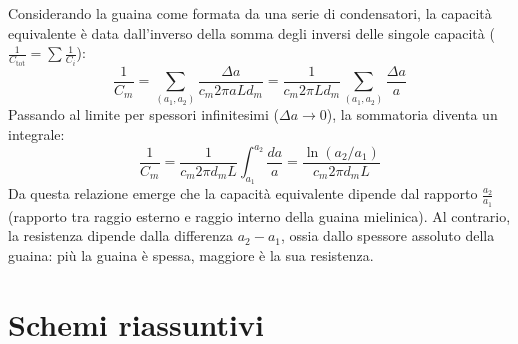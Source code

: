 Considerando la guaina come formata da una serie di condensatori, la capacità equivalente è data dall'inverso della somma degli inversi delle singole capacità ($\frac{1}{C_{\text{tot}}} = \sum \frac{1}{C_i}$):
\begin{equation}
    \frac{1}{C_m} = \sum_{(a_1, a_2)} \frac{\Delta a}{c_m 2\pi a L d_m} = \frac{1}{c_m 2\pi L d_m} \sum_{(a_1, a_2)} \frac{\Delta a}{a}
\end{equation}
Passando al limite per spessori infinitesimi ($\Delta a \to 0$), la sommatoria diventa un integrale:
\begin{equation}
    \frac{1}{C_m} = \frac{1}{c_m 2\pi d_m L} \int_{a_1}^{a_2} \frac{da}{a} = \frac{\ln(a_2 / a_1)}{c_m 2\pi d_m L}
\end{equation}
Da questa relazione emerge che la capacità equivalente dipende dal rapporto $\frac{a_2}{a_1}$ (rapporto tra raggio esterno e raggio interno della guaina mielinica). Al contrario, la resistenza dipende dalla differenza $a_2 - a_1$, ossia dallo spessore assoluto della guaina: più la guaina è spessa, maggiore è la sua resistenza.
\newpage
\section{Schemi riassuntivi}

